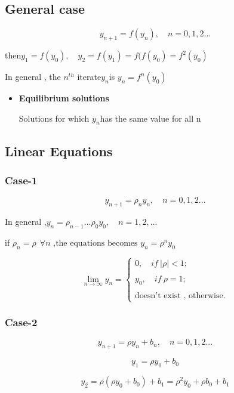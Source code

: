 \documentclass[12pt, a4paper]{article}
\theoremstyle{break}
\begin{document}
\subsection{General case}\label{general-case}

\[
y_{n+1} = f(y_n), \quad n = 0 ,1, 2...
\]

then\(y_1 = f(y_0) ,\quad y_2 = f(y_1) = f(f(y_0) = f^2(y_0)\)

In general , the \(n^{th}\) iterate\(y_n\)is \(y_n = f^n(y_0)\)

\begin{itemize}
\item
  \textbf{Equilibrium solutions}

  Solutions for which \(y_n\)has the same value for all n
\end{itemize}

\subsection{Linear Equations}\label{linear-equations}

\subsubsection{Case-1}\label{case-1}

\[
y_{n+1} = \rho_ny_n,\quad n= 0 ,1 ,2...
\]

In general ,\(y_n = \rho_{n-1}...\rho_0y_0 ,\quad n = 1 ,2 ,...\)

if \(\rho_n = \rho \ \ \forall n \text{ ,the equations becomes } y_n = \rho^n y_0\)

\[
\lim_{n \to \infty}{y_n} = \begin{cases} 0, \quad if \ |\rho| < 1; \\ \quad \\ y_0, \quad if \ \rho = 1; \\ \\ \text{doesn't exist ,  otherwise.} \end{cases}
\]

\subsubsection{Case-2}\label{case-2}

\[
y_{n+1} = \rho y_n + b_n,\quad n = 0,1,2 ...
\]

\[
y_1 = \rho y_0 + b_0
\]

\[
y_2 = \rho(\rho y_0 + b_0) + b_1 = \rho^2 y_0 + \rho b_0 + b_1
\]
\end{document}
